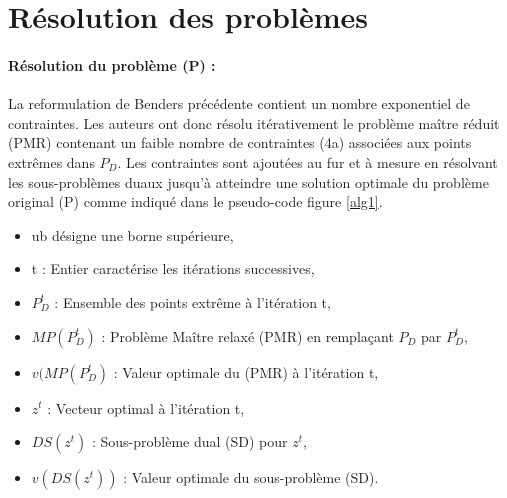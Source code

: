 \section{Résolution des problèmes}

\paragraph{Résolution du problème (P) :}La reformulation de Benders précédente contient un nombre exponentiel de contraintes. Les auteurs ont donc résolu itérativement le problème maître réduit (PMR) contenant un faible nombre de contraintes (4a) associées aux points extrêmes dans $P_D$. Les contraintes sont ajoutées au fur et à mesure en résolvant les sous-problèmes duaux jusqu'à atteindre une solution optimale du problème original (P) comme indiqué dans le pseudo-code  figure \ref{alg1}.

\begin{itemize}
	\item ub désigne une borne supérieure,
	\item t : Entier caractérise les itérations successives,
	\item $P^t_D$ : Ensemble des points extrême à l'itération t, 
	\item  $MP(P^t_D)$ : Problème Maître relaxé (PMR) en remplaçant $P_D$ par $P^t_D$,
	\item $v(MP(P^t_D)$ : Valeur optimale du (PMR) à l'itération t,
	\item $z^t$ : Vecteur optimal à l'itération t,
	\item $DS(z^t)$ : Sous-problème dual (SD) pour $z^t$,
	\item $v(DS(z^t))$ : Valeur optimale du sous-problème (SD).
\end{itemize}

